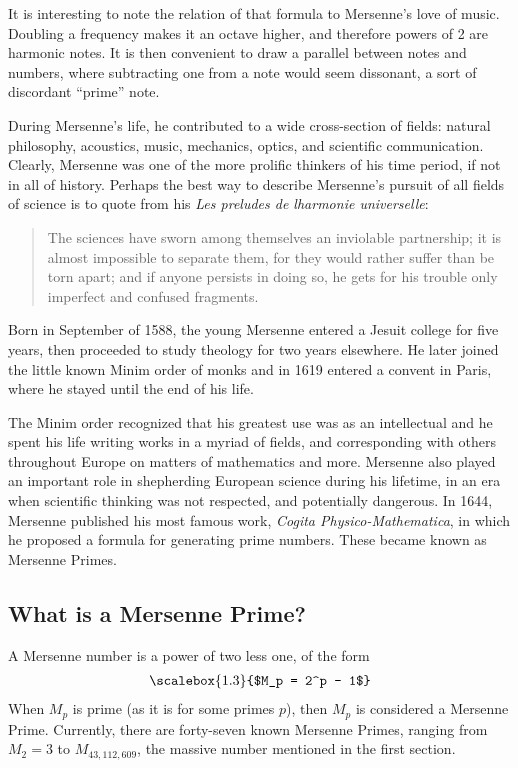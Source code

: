 It is interesting to note the relation of that formula to Mersenne's love of music.  Doubling a frequency makes it an octave higher, and therefore powers of 2 are harmonic notes.  It is then convenient to draw a parallel between notes and numbers, where subtracting one from  a note would seem dissonant, a sort of discordant ``prime'' note. 

During Mersenne's life, he contributed to a wide cross-section of fields: natural philosophy, acoustics, music, mechanics, optics, and scientific communication\cite{scibio}. Clearly, Mersenne was one of the more prolific thinkers of his time period, if not in all of history. Perhaps the best way to describe Mersenne's pursuit of all fields of science is to quote from his \emph{Les preludes de lharmonie universelle}:

\begin{quote}
The sciences have sworn among themselves an inviolable partnership; it is almost impossible to separate them, for they would rather suffer than be torn apart; and if anyone persists in doing so, he gets for his trouble only imperfect and confused fragments. \cite{lfrench}
\end{quote}

Born in September of 1588, the young Mersenne entered a Jesuit college for five years, then proceeded to study theology for two years elsewhere. He later joined the little known Minim order of monks and in 1619 entered a convent in Paris, where he stayed until the end of his life.

The Minim order recognized that his greatest use was as an intellectual and he spent his life writing works in a myriad of fields, and corresponding with others throughout Europe on matters of mathematics and more. Mersenne also played an important role in shepherding European science during his lifetime, in an era when scientific thinking was not respected, and potentially dangerous. In 1644, Mersenne published his most famous work, \emph{Cogita Physico-Mathematica}, in which he proposed a formula for generating prime numbers. These became known as Mersenne Primes.

\subsection{What is a Mersenne Prime?}

A Mersenne number is a power of two less one, of the form
\begin{align}
\scalebox{1.3}{$M_p = 2^p - 1$}
\label{eqn:mp}
\end{align}
When $M_p$ is prime (as it is for some primes $p$), then $M_p$ is considered a Mersenne Prime. Currently,
there are forty-seven known Mersenne Primes, ranging from $M_2 = 3$ to $M_{43,112,609}$, the massive number mentioned in the first section.


